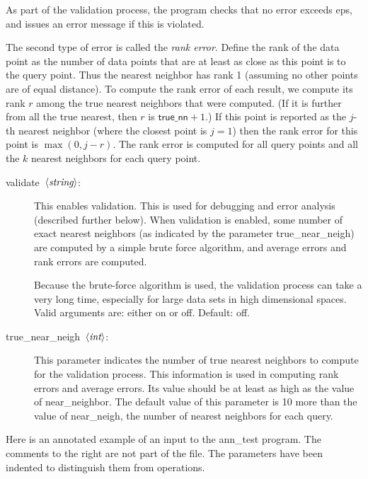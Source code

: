 \documentclass[11pt]{article}		%
\newcommand\ang[1]{\langle #1\rangle}
\newcommand{\anntest}[0]{\textsf{ann\_test}}
\newcommand{\STRING}[0]{$\ang{\textit{string}\/}$}
\newcommand{\INT}[0]{$\ang{\textit{int}\/}$}
\begin{document}
As part of the validation process, the program checks that no error exceeds
\textsf{eps}, and issues an error message if this is violated.

The second type of error is called the \emph{rank error}.  Define the rank
of the data point as the number of data points that are at least as close
as this point is to the query point.  Thus the nearest neighbor has rank
1 (assuming no other points are of equal distance).  To compute the rank
error of each result, we compute its rank $r$ among the true nearest
neighbors that were computed.  (If it is further from all the true nearest,
then $r$ is $\textsf{true\_nn}+1$.)  If this point is reported as the $j$-th
nearest neighbor (where the closest point is $j=1$) then the rank error
for this point is $\max(0, j-r)$.  The rank error is computed for all
query points and all the $k$ nearest neighbors for each query point.

\begin{description}
\item[\hbox{\sf validate \STRING:}]
	This enables validation.  This is used for debugging and error
	analysis (described further below).  When validation is enabled,
	some number of exact nearest neighbors (as indicated by the parameter
	\textsf{true\_near\_neigh}) are computed by a simple brute force
	algorithm, and average errors and rank errors are computed.

	Because the brute-force algorithm is used, the validation
	process can take a very long time, especially for large data sets
	in high dimensional spaces.  Valid arguments are: either \textsf{on}
	or \textsf{off}.  Default: \textsf{off}.

\item[\hbox{\sf true\_near\_neigh \INT:}]
	This parameter indicates the number of true nearest neighbors to
	compute for the validation process.  This information is used
	in computing rank errors and average errors.  Its value should
	be at least as high as the value of \textsf{near\_neighbor}.  The
	default value of this parameter is 10 more than the value of
	\textsf{near\_neigh}, the number of nearest neighbors for each query.
\end{description}

Here is an annotated example of an input to the {\anntest} program.  The
comments to the right are not part of the file.  The parameters have been
indented to distinguish them from operations.
\end{document}
